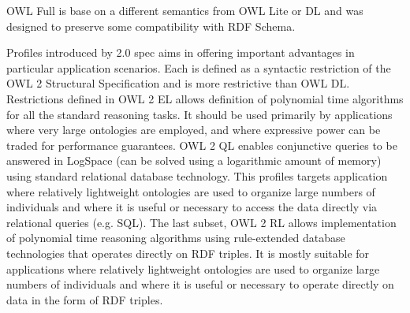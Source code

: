 OWL Full is base on a different semantics from OWL Lite or DL and was designed to preserve some compatibility with RDF Schema. 

Profiles introduced by 2.0 spec aims in offering important advantages in particular application scenarios. Each is defined as a syntactic restriction of the OWL 2 Structural Specification and is more restrictive than OWL DL. Restrictions defined in OWL 2 EL allows definition of polynomial time algorithms for all the standard reasoning tasks. It should be used primarily by applications where very large ontologies are employed, and where expressive power can be traded for performance guarantees. OWL 2 QL enables conjunctive queries to be answered in LogSpace (can be solved using a logarithmic amount of memory) using standard relational database technology. This profiles targets application where relatively lightweight ontologies are used to organize large numbers of individuals and where it is useful or necessary to access the data directly via relational queries (e.g.  SQL). The last subset, OWL 2 RL allows implementation of polynomial time reasoning algorithms using rule-extended database technologies that operates directly on RDF triples. It is mostly suitable for applications where relatively lightweight ontologies are used to organize large numbers of individuals and where it is useful or necessary to operate directly on data in the form of RDF triples.

